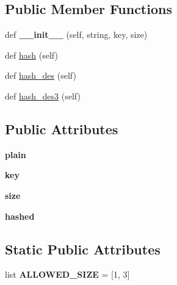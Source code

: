 \subsection*{Public Member Functions}
\begin{DoxyCompactItemize}
\item 
def {\bfseries \+\_\+\+\_\+init\+\_\+\+\_\+} (self, string, key, size)\hypertarget{classhal_1_1maths_1_1crypt_1_1_d_e_s_a163fe40de3514de90bf07230f18cb891}{}\label{classhal_1_1maths_1_1crypt_1_1_d_e_s_a163fe40de3514de90bf07230f18cb891}

\item 
def \hyperlink{classhal_1_1maths_1_1crypt_1_1_d_e_s_a950a921233fa101b5be1c2910c1e0595}{hash} (self)
\item 
def \hyperlink{classhal_1_1maths_1_1crypt_1_1_d_e_s_a0e397526a54b62510f118a0859b3c8b6}{hash\+\_\+des} (self)
\item 
def \hyperlink{classhal_1_1maths_1_1crypt_1_1_d_e_s_a9183df60a448c690beb8ac117262aa41}{hash\+\_\+des3} (self)
\end{DoxyCompactItemize}
\subsection*{Public Attributes}
\begin{DoxyCompactItemize}
\item 
{\bfseries plain}\hypertarget{classhal_1_1maths_1_1crypt_1_1_d_e_s_a7f7043d08dd641c3e061d6316263754a}{}\label{classhal_1_1maths_1_1crypt_1_1_d_e_s_a7f7043d08dd641c3e061d6316263754a}

\item 
{\bfseries key}\hypertarget{classhal_1_1maths_1_1crypt_1_1_d_e_s_a5220f18392796674edee54db1772365b}{}\label{classhal_1_1maths_1_1crypt_1_1_d_e_s_a5220f18392796674edee54db1772365b}

\item 
{\bfseries size}\hypertarget{classhal_1_1maths_1_1crypt_1_1_d_e_s_a0197f3353d660bba2ee2046b0e27ff4f}{}\label{classhal_1_1maths_1_1crypt_1_1_d_e_s_a0197f3353d660bba2ee2046b0e27ff4f}

\item 
{\bfseries hashed}\hypertarget{classhal_1_1maths_1_1crypt_1_1_d_e_s_a413aae8583c759879becd80f35dd335d}{}\label{classhal_1_1maths_1_1crypt_1_1_d_e_s_a413aae8583c759879becd80f35dd335d}

\end{DoxyCompactItemize}
\subsection*{Static Public Attributes}
\begin{DoxyCompactItemize}
\item 
list {\bfseries A\+L\+L\+O\+W\+E\+D\+\_\+\+S\+I\+ZE} = \mbox{[}1, 3\mbox{]}\hypertarget{classhal_1_1maths_1_1crypt_1_1_d_e_s_af4a6996632dc4bc9711ec4f17ca3c425}{}\label{classhal_1_1maths_1_1crypt_1_1_d_e_s_af4a6996632dc4bc9711ec4f17ca3c425}

\end{DoxyCompactItemize}


